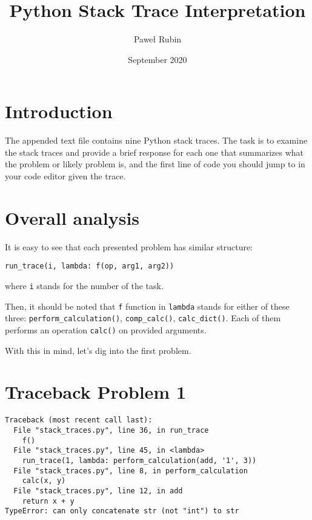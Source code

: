 \documentclass[8pt, a4paper]{article}
\title{Python Stack Trace Interpretation}
\author{Paweł Rubin}
\date{September 2020}
\begin{document}
\maketitle

\section*{Introduction}

The appended text file contains nine Python stack traces. The task is to examine the stack traces and provide a brief response for each one that summarizes what the problem or likely problem is, and the first line of code you should jump to in your code editor given the trace.

\section*{Overall analysis}

It is easy to see that each presented problem has similar structure:

\begin{verbatim}
run_trace(i, lambda: f(op, arg1, arg2))
\end{verbatim}
where \texttt{i} stands for the number of the task.

\smallskip

Then, it should be noted that \texttt{f} function in \texttt{lambda} stands for either of these three:
\texttt{perform_calculation()}, \texttt{comp_calc()}, \texttt{calc_dict()}.
Each of them performs an operation \texttt{calc()} on provided arguments.

\smallskip

With this in mind, let's dig into the first problem.


\section*{Traceback Problem 1}

\begin{verbatim}
Traceback (most recent call last):
  File "stack_traces.py", line 36, in run_trace
    f()
  File "stack_traces.py", line 45, in <lambda>
    run_trace(1, lambda: perform_calculation(add, '1', 3))
  File "stack_traces.py", line 8, in perform_calculation
    calc(x, y)
  File "stack_traces.py", line 12, in add
    return x + y
TypeError: can only concatenate str (not "int") to str
\end{verbatim}
\end{document}
